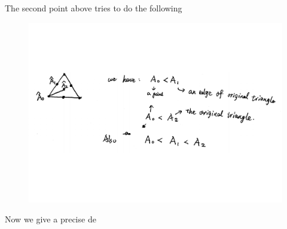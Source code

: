 \begin{remark}
    The second point above tries to do the following
    \begin{figure}[H]
        \centering
        \includegraphics[width=0.9\linewidth]{pics/ch6-scanned-notes-1/p9.pdf}
    \end{figure}
\end{remark}

Now we give a precise de
